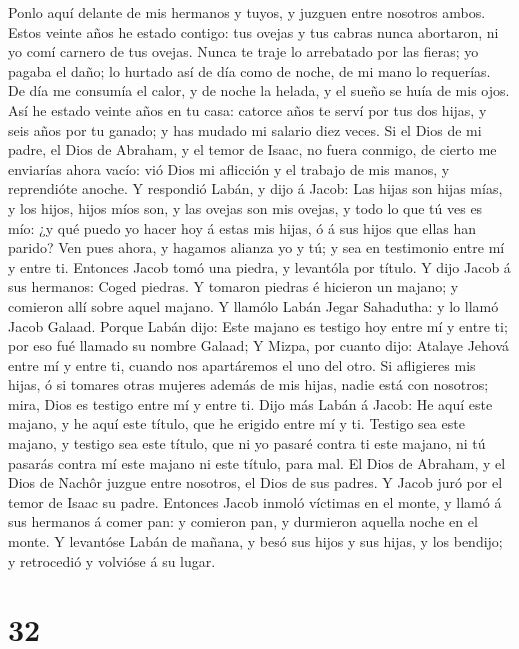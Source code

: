 Ponlo aquí delante de mis hermanos y tuyos, y juzguen entre nosotros
ambos.  Estos veinte años he estado contigo: tus ovejas y
tus cabras nunca abortaron, ni yo comí carnero de tus ovejas.
 Nunca te traje lo arrebatado por las fieras; yo pagaba
el daño; lo hurtado así de día como de noche, de mi mano lo requerías.
 De día me consumía el calor, y de noche la helada, y el
sueño se huía de mis ojos.  Así he estado veinte años en
tu casa: catorce años te serví por tus dos hijas, y seis años por tu
ganado; y has mudado mi salario diez veces.  Si el Dios
de mi padre, el Dios de Abraham, y el temor de Isaac, no fuera conmigo,
de cierto me enviarías ahora vacío: vió Dios mi aflicción y el trabajo
de mis manos, y reprendióte anoche.  Y respondió Labán, y
dijo á Jacob: Las hijas son hijas mías, y los hijos, hijos míos son, y
las ovejas son mis ovejas, y todo lo que tú ves es mío: ¿y qué puedo yo
hacer hoy á estas mis hijas, ó á sus hijos que ellas han parido?
 Ven pues ahora, y hagamos alianza yo y tú; y sea en
testimonio entre mí y entre ti.  Entonces Jacob tomó una
piedra, y levantóla por título.  Y dijo Jacob á sus
hermanos: Coged piedras. Y tomaron piedras é hicieron un majano; y
comieron allí sobre aquel majano.  Y llamólo Labán Jegar
Sahadutha: y lo llamó Jacob Galaad.  Porque Labán dijo:
Este majano es testigo hoy entre mí y entre ti; por eso fué llamado su
nombre Galaad;  Y Mizpa, por cuanto dijo: Atalaye Jehová
entre mí y entre ti, cuando nos apartáremos el uno del otro.
 Si afligieres mis hijas, ó si tomares otras mujeres
además de mis hijas, nadie está con nosotros; mira, Dios es testigo
entre mí y entre ti.  Dijo más Labán á Jacob: He aquí
este majano, y he aquí este título, que he erigido entre mí y ti.
 Testigo sea este majano, y testigo sea este título, que
ni yo pasaré contra ti este majano, ni tú pasarás contra mí este majano
ni este título, para mal.  El Dios de Abraham, y el Dios
de Nachôr juzgue entre nosotros, el Dios de sus padres. Y Jacob juró por
el temor de Isaac su padre.  Entonces Jacob inmoló
víctimas en el monte, y llamó á sus hermanos á comer pan: y comieron
pan, y durmieron aquella noche en el monte.  Y levantóse
Labán de mañana, y besó sus hijos y sus hijas, y los bendijo; y
retrocedió y volvióse á su lugar.

\hypertarget{section-31}{%
\section{32}\label{section-31}}

